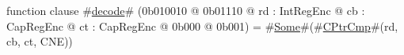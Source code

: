 function clause #\hyperref[sailMIPSzdecode]{decode}# (0b010010 @ 0b01110 @ rd : IntRegEnc @ cb : CapRegEnc @ ct : CapRegEnc @ 0b000 @ 0b001) = #\hyperref[sailMIPSzSome]{Some}#(#\hyperref[sailMIPSzCPtrCmp]{CPtrCmp}#(rd, cb, ct, CNE))
